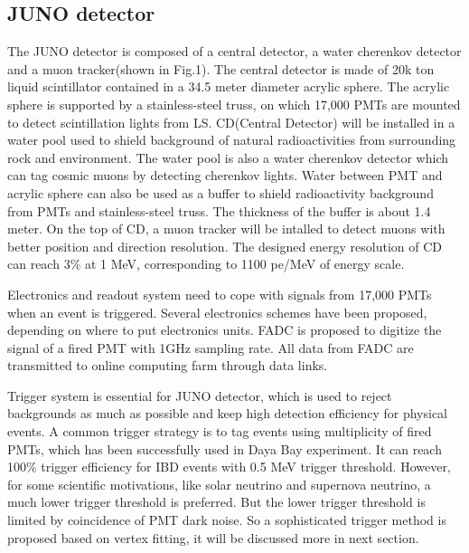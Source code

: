 \documentclass[a4paper,10pt,twoside]{paper}
\begin{document}
\begin{multicols}{2}
		\section{JUNO detector}
		The JUNO detector is composed of a central detector, a water
		cherenkov detector and a muon tracker(shown in Fig.1). The 
		central detector is made of 20k ton liquid scintillator contained in a 34.5 meter diameter acrylic sphere.
                The acrylic sphere is supported by a stainless-steel truss, on which 17,000 PMTs are mounted to detect scintillation lights from LS. 
		CD(Central Detector) will be installed in a water pool used to shield background of natural radioactivities from surrounding rock and environment. 
                The water pool is also a water cherenkov detector which can tag cosmic muons by detecting cherenkov lights. 
                Water between PMT and acrylic sphere can also be used as a buffer to shield radioactivity background from PMTs and stainless-steel truss.
                The thickness of the buffer is about 1.4 meter. On the top of CD, a muon tracker will be intalled to detect muons with better position and direction resolution.
                The designed energy resolution of CD can reach 3\% at 1 MeV, corresponding to 1100 pe/MeV of energy scale.

                Electronics and readout system need to cope with signals from 17,000 PMTs when an event is triggered.
                Several electronics schemes have been proposed, depending on where to put electronics units.
                FADC is proposed to digitize the signal of a fired PMT with 1GHz sampling rate.
                All data from FADC are transmitted to online computing farm through data links.

                Trigger system is essential for JUNO detector, which is used to reject backgrounds as much as possible and keep high detection efficiency for physical events.
                A common trigger strategy is to tag events using multiplicity of fired PMTs, which has been successfully used in Daya Bay experiment. It can reach 100\% trigger
                efficiency for IBD events with 0.5 MeV trigger threshold. However, for some scientific motivations, like solar neutrino and supernova neutrino, a much lower 
                trigger threshold is preferred. But the lower trigger threshold is limited by coincidence of PMT dark noise. 
                So a sophisticated trigger method is proposed based on vertex fitting, it will be discussed more in next section.
                

\end{multicols}
\end{document}
